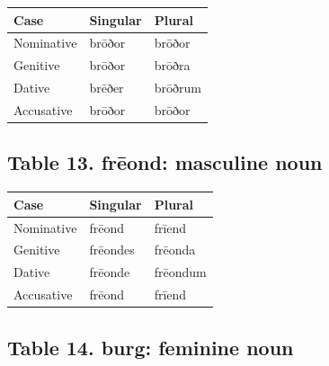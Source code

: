 \par\begingroup
\fontsize{10.5}{13.2}\selectfont
\setlength{\LTleft}{0pt}\setlength{\LTright}{\fill}
\noindent
\begin{tabular}{@{}>{\raggedright\arraybackslash}p{39.46mm}>{\raggedright\arraybackslash}p{39.46mm}>{\raggedright\arraybackslash}p{39.46mm}@{}}
\toprule
\textbf{Case} & \textbf{Singular} & \textbf{Plural} \\
\midrule
Nominative & brōðor & brōðor \\
Genitive & brōðor & brōðra \\
Dative & brēðer & brōðrum \\
Accusative & brōðor & brōðor \\
\bottomrule
\end{tabular}
\par\endgroup

\subsection*{Table 13. frēond: masculine noun}

\par\begingroup
\fontsize{10.5}{13.2}\selectfont
\setlength{\LTleft}{0pt}\setlength{\LTright}{\fill}
\noindent
\begin{tabular}{@{}>{\raggedright\arraybackslash}p{39.46mm}>{\raggedright\arraybackslash}p{39.46mm}>{\raggedright\arraybackslash}p{39.46mm}@{}}
\toprule
\textbf{Case} & \textbf{Singular} & \textbf{Plural} \\
\midrule
Nominative & frēond & frīend \\
Genitive & frēondes & frēonda \\
Dative & frēonde & frēondum \\
Accusative & frēond & frīend \\
\bottomrule
\end{tabular}
\par\endgroup

\subsection*{Table 14. burg: feminine noun}

